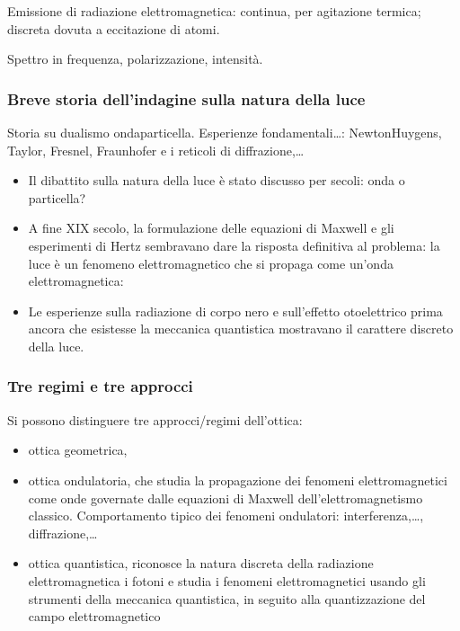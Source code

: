 \documentclass[letterpaper,10pt,italian]{jupyterBook}
\begin{document}
\sphinxAtStartPar
{} Emissione di radiazione elettromagnetica: continua, per agitazione termica; discreta dovuta a eccitazione di atomi.

\sphinxAtStartPar
{} Spettro in frequenza, polarizzazione, intensità.
\subsubsection*{Breve storia dell’indagine sulla natura della luce}

\sphinxAtStartPar
{} Storia su dualismo onda\sphinxhyphen{}particella. Esperienze fondamentali…: Newton\sphinxhyphen{}Huygens, Taylor, Fresnel, Fraunhofer e i reticoli di diffrazione,…
\begin{itemize}
\item {} 
\sphinxAtStartPar
Il dibattito sulla natura della luce è stato discusso per secoli: onda o particella?

\item {} 
\sphinxAtStartPar
A fine XIX secolo, la formulazione delle equazioni di Maxwell e gli esperimenti di Hertz sembravano dare la risposta definitiva al problema: la luce è un fenomeno elettromagnetico che si propaga come un’onda elettromagnetica:

\item {} 
\sphinxAtStartPar
Le esperienze sulla radiazione di corpo nero e sull’effetto otoelettrico \sphinxhyphen{} prima ancora che esistesse la meccanica quantistica \sphinxhyphen{} mostravano il carattere discreto della luce.

\end{itemize}
\subsubsection*{Tre regimi e tre approcci}

\sphinxAtStartPar
Si possono distinguere tre approcci/regimi dell’ottica:
\begin{itemize}
\item {} 
\sphinxAtStartPar
ottica geometrica,   

\item {} 
\sphinxAtStartPar
ottica ondulatoria, che studia la propagazione dei fenomeni elettromagnetici come onde governate dalle equazioni di Maxwell dell’elettromagnetismo classico. Comportamento tipico dei fenomeni ondulatori: interferenza,…, diffrazione,…   

\item {} 
\sphinxAtStartPar
ottica quantistica, riconosce la natura discreta della radiazione elettromagnetica \sphinxhyphen{} i fotoni \sphinxhyphen{} e studia i fenomeni elettromagnetici usando gli strumenti della meccanica quantistica, in seguito alla quantizzazione del campo elettromagnetico   

\end{itemize}
\end{document}
